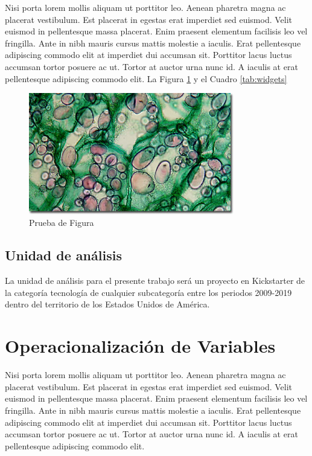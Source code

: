  Nisi porta lorem mollis aliquam ut porttitor leo. Aenean pharetra magna ac placerat vestibulum. Est placerat in egestas erat imperdiet sed euismod. Velit euismod in pellentesque massa placerat. Enim praesent elementum facilisis leo vel fringilla. Ante in nibh mauris cursus mattis molestie a iaculis. Erat pellentesque adipiscing commodo elit at imperdiet dui accumsan sit. Porttitor lacus luctus accumsan tortor posuere ac ut. Tortor at auctor urna nunc id. A iaculis at erat pellentesque adipiscing commodo elit. La Figura \ref{fig1} y el Cuadro \ref{tab:widgets}

	\begin{figure}[h]
		\begin{center}
			\includegraphics[width=0.8\textwidth]{3/figures/largepotato.jpg}
			\caption{Prueba de Figura}
			\label{fig1}
		\end{center}
		
	\end{figure}

\subsection{Unidad de análisis}
La unidad de análisis para el presente trabajo será un proyecto en Kickstarter de la categoría tecnología de cualquier subcategoría entre los periodos 2009-2019 dentro del territorio de los Estados Unidos de América.


\section{Operacionalización de Variables}

Nisi porta lorem mollis aliquam ut porttitor leo. Aenean pharetra magna ac placerat vestibulum. Est placerat in egestas erat imperdiet sed euismod. Velit euismod in pellentesque massa placerat. Enim praesent elementum facilisis leo vel fringilla. Ante in nibh mauris cursus mattis molestie a iaculis. Erat pellentesque adipiscing commodo elit at imperdiet dui accumsan sit. Porttitor lacus luctus accumsan tortor posuere ac ut. Tortor at auctor urna nunc id. A iaculis at erat pellentesque adipiscing commodo elit.
